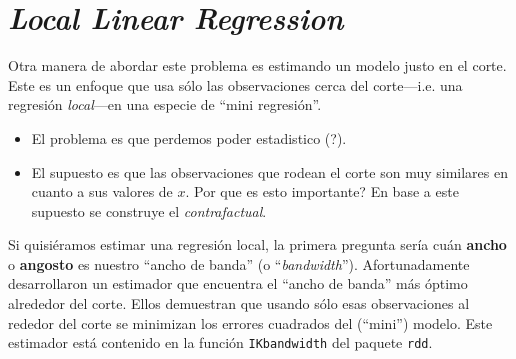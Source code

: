 \documentclass[onesided]{article}\usepackage[]{graphicx}\usepackage[]{color}
\begin{document}
\section{\emph{Local Linear Regression}}

Otra manera de abordar este problema es estimando un modelo justo en el corte. Este es un enfoque que usa s\'olo las observaciones cerca del corte---i.e. una regresi\'on \emph{local}---en una especie de ``mini regresi\'on''. 

\begin{itemize}
	\item El problema es que perdemos poder estadistico ({\color{red}?}).
	\item El supuesto es que las observaciones que rodean el corte son muy similares en cuanto a sus valores de $x$. {\color{red}Por que es esto importante?} En base a este supuesto se construye el \emph{contrafactual}. 
\end{itemize}

Si quisi\'eramos estimar una regresi\'on local, la primera pregunta ser\'ia cu\'an {\bf ancho} o {\bf angosto} es nuestro ``ancho de banda'' (o ``\emph{bandwidth}''). Afortunadamente \textcite{Imbens2012} desarrollaron un estimador que encuentra el ``ancho de banda'' m\'as \'optimo alrededor del corte. Ellos demuestran que usando s\'olo esas observaciones al rededor del corte se minimizan los errores cuadrados del (``mini'') modelo. Este estimador est\'a contenido en la funci\'on \texttt{IKbandwidth} del paquete \texttt{rdd}. 
\end{document}
